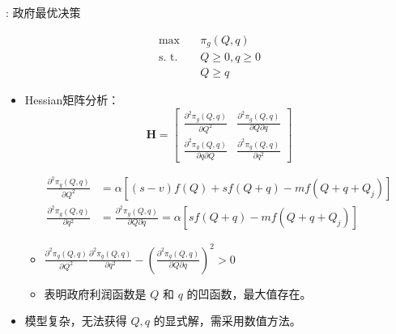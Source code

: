 \documentclass[9pt]{beamer}
\begin{document}
\begin{frame}{\insertsectionhead: 政府最优决策}
   \begin{small}
    \begin{equation} \label{eq:optimization}
\begin{split}
\max \quad & \pi_g(Q,q) \\
\text{s. t.} \quad & Q \ge 0 ,q \ge 0\\
& Q\ge q
\end{split}
\end{equation}
\end{small} 
\begin{itemize}        
        \item Hessian矩阵分析：
        \begin{equation} \label{eq:hessian}
\boldsymbol{H} = \begin{bmatrix}
\frac{\partial^2 \pi_g(Q,q)}{\partial Q^2} & \frac{\partial^2 \pi_g(Q,q)}{\partial Q\partial q} \\
\frac{\partial^2 \pi_g(Q,q)}{\partial q\partial Q} & \frac{\partial^2 \pi_g(Q,q)}{\partial q^2}
\end{bmatrix}
\end{equation}
\begin{small}
    \begin{align*}
\frac{\partial^2 \pi_g(Q,q)}{\partial Q^2} &= \alpha [ (s-v)f(Q) + s f(Q+q) - m f(Q+q+Q_j) ] \\
\frac{\partial^2 \pi_g(Q,q)}{\partial q^2} &= \frac{\partial^2 \pi_g(Q,q)}{\partial Q\partial q} =  \alpha [ s f(Q+q) - m f(Q+q+Q_j) ] 
\end{align*}
\end{small}
        \begin{itemize}
                \item $\frac{\partial^2 \pi_g(Q,q)}{\partial Q^2} \frac{\partial^2 \pi_g(Q,q)}{\partial q^2} - \left(\frac{\partial^2 \pi_g(Q,q)}{\partial Q\partial q}\right)^2 > 0$
                \item 表明政府利润函数是 $Q$ 和 $q$ 的凹函数，最大值存在。
            \end{itemize}
        \item 模型复杂，无法获得 $Q, q$ 的显式解，需采用数值方法。
    \end{itemize}
\end{frame}
\end{document}
